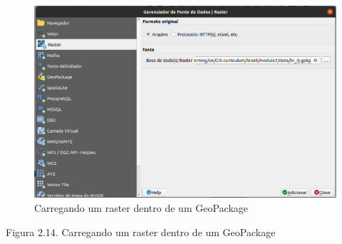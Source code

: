 \documentclass[
]{book}
\begin{document}
\begin{figure}
\centering
\includegraphics{media/modulo2/data-source-manager-raster.png}
\caption{Carregando um raster dentro de um GeoPackage}
\end{figure}

Figura 2.14. Carregando um raster dentro de um GeoPackage
\end{document}
